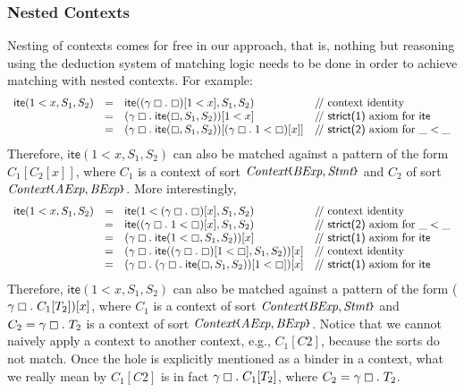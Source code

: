 \documentclass[UTF8,11pt]{article}
\theoremstyle{plain}
\theoremstyle{definition}
\theoremstyle{remark}
\newcommand{\Context}{\textit{Context}}
\newcommand{\hole}{\boxempty}
\newcommand{\AExp}{\textit{AExp}}
\newcommand{\BExp}{\textit{BExp}}
\newcommand{\Stmt}{\textit{Stmt}}
\newcommand{\ite}{\textsf{ite}}
\newcommand{\parametric}[2]{{#1}\raisebox{.2ex}{\texttt{\footnotesize{\{}}}#2\raisebox{.2ex}{\texttt{\footnotesize{\}}}}}
\newcommand{\doubleslash}{/\!/{ }}
\begin{document}
\subsubsection{Nested Contexts}

Nesting of contexts comes for free in our approach, that is, nothing but
reasoning using the deduction system of matching logic needs to be done
in order to achieve matching with nested contexts.
For example:
$$
\begin{array}{rcll}
\ite(1 < x,S_1,S_2) & = &
\ite((\gamma\hole.\;\hole)[1 < x],S_1,S_2)
& \textrm{\doubleslash context identity}
\\
& = &
(\gamma\hole.\;\ite(\hole,S_1,S_2))[1 < x]
& \textrm{\doubleslash \textsf{strict(1)} axiom for $\ite$}
\\
& = &
(\gamma\hole.\;\ite(\hole,S_1,S_2))[(\gamma\hole.\;1 < \hole)[x]]
& \textrm{\doubleslash \textsf{strict(2)} axiom for $\_<\_$}
\end{array}
$$
Therefore, $\ite(1 < x,S_1,S_2)$ can also be matched against a pattern
of the form $C_1[C_2[x]]$, where $C_1$ is a context of sort
$\parametric{\Context}{\BExp,\Stmt}$ and $C_2$ of sort
$\parametric{\Context}{\AExp,\BExp}$.
More interestingly,
$$
\begin{array}{rcll}
\ite(1 < x,S_1,S_2) & = &
\ite(1 < (\gamma\hole.\;\hole)[x],S_1,S_2)
& \textrm{\doubleslash context identity}
\\
& = &
\ite((\gamma\hole.\;1 < \hole)[x],S_1,S_2)
& \textrm{\doubleslash \textsf{strict(2)} axiom for $\_<\_$}
\\
& = &
(\gamma\hole.\;\ite(1 < \hole,S_1,S_2))[x]
& \textrm{\doubleslash \textsf{strict(1)} axiom for $\ite$}
\\
& = &
(\gamma\hole.\;\ite((\gamma\hole.\;\hole)[1 < \hole],S_1,S_2))[x]
& \textrm{\doubleslash context identity}
\\
& = &
(\gamma\hole.\;(\gamma\hole.\;\ite(\hole,S_1,S_2))[1 < \hole])[x]
& \textrm{\doubleslash \textsf{strict(1)} axiom for $\ite$}
\end{array}
$$
Therefore, $\ite(1 < x,S_1,S_2)$ can also be matched against a pattern
of the form ($\gamma\hole.\;C_1[T_2])[x]$, where $C_1$ is a context of
sort $\parametric{\Context}{\BExp,\Stmt}$ and $C_2 = \gamma\hole.\;T_2$ is
a context of sort $\parametric{\Context}{\AExp,\BExp}$.
Notice that we cannot naively apply a context to another context, e.g.,
$C_1[C2]$, because the sorts do not match.
Once the hole is explicitly mentioned as a binder in a context, what we really
mean by $C_1[C2]$ is in fact $\gamma\hole.\;C_1[T_2]$, where
$C_2 = \gamma\hole.\;T_2$.
\end{document}
